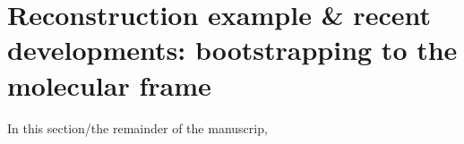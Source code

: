 \section{Reconstruction example & recent developments: bootstrapping to the molecular frame}

In this section/the remainder of the manuscrip, 
